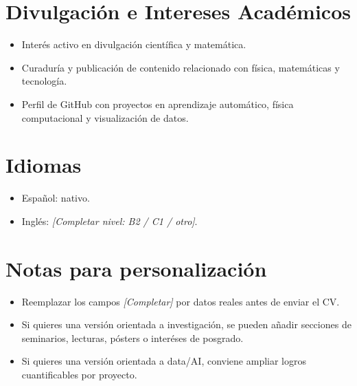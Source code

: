 \documentclass[11pt,a4paper]{article}
\begin{document}
\section*{Divulgaci\'on e Intereses Acad\'emicos}
\begin{itemize}
    \item Inter\'es activo en divulgaci\'on cient\'ifica y matem\'atica.
    \item Curadur\'ia y publicaci\'on de contenido relacionado con f\'isica, matem\'aticas y tecnolog\'ia.
    \item Perfil de GitHub con proyectos en aprendizaje autom\'atico, f\'isica computacional y visualizaci\'on de datos.
\end{itemize}

\section*{Idiomas}
\begin{itemize}
    \item Espa\~nol: nativo.
    \item Ingl\'es: \textit{[Completar nivel: B2 / C1 / otro]}.
\end{itemize}

\section*{Notas para personalizaci\'on}
\begin{itemize}
    \item Reemplazar los campos \textit{[Completar]} por datos reales antes de enviar el CV.
    \item Si quieres una versi\'on orientada a investigaci\'on, se pueden a\~nadir secciones de seminarios, lecturas, p\'osters o inter\'eses de posgrado.
    \item Si quieres una versi\'on orientada a data/AI, conviene ampliar logros cuantificables por proyecto.
\end{itemize}
\end{document}
